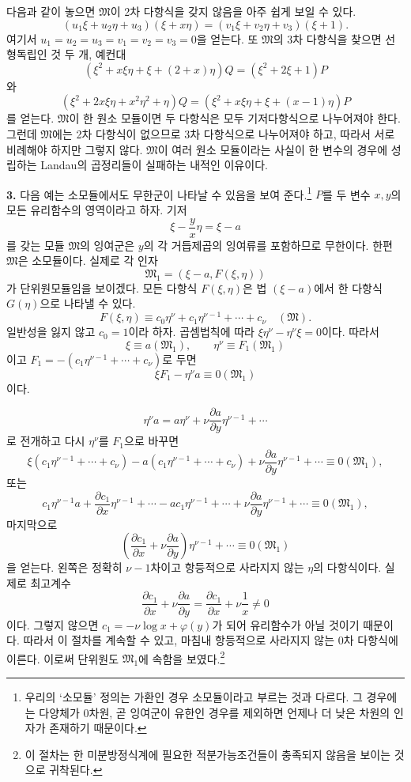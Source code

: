 다음과 같이 놓으면 \(\mathfrak M\)이 2차 다항식을 갖지 않음을 아주 쉽게 보일 수 있다.
\[
 (u_1\xi+u_2\eta+u_3)(\xi+x\eta)
 =(v_1\xi+v_2\eta+v_3)(\xi+1).
\]
여기서 \(u_1=u_2=u_3=v_1=v_2=v_3=0\)을 얻는다. 또 \(\mathfrak M\)의 3차 다항식을 찾으면 선형독립인 것 두 개, 예컨대
\[
 (\xi^2+x\xi\eta+\xi+(2+x)\eta)Q
 =(\xi^2+2\xi+1)P
\]
와
\[
 (\xi^2+2x\xi\eta+x^2\eta^2+\eta)Q
 =(\xi^2+x\xi\eta+\xi+(x-1)\eta)P
\]
를 얻는다. \(\mathfrak M\)이 한 원소 모듈이면 두 다항식은 모두 기저다항식으로 나누어져야 한다. 그런데 \(\mathfrak M\)에는 2차 다항식이 없으므로 3차 다항식으로 나누어져야 하고, 따라서 서로 비례해야 하지만 그렇지 않다. \(\mathfrak M\)이 여러 원소 모듈이라는 사실이 한 변수의 경우에 성립하는 Landau의 곱정리들이 실패하는 내적인 이유이다.

\textbf{3.} 다음 예는 소모듈에서도 무한군이 나타날 수 있음을 보여 준다.\footnote{우리의 ‘소모듈’ 정의는 가환인 경우 소모듈이라고 부르는 것과 다르다. 그 경우에는 다양체가 0차원, 곧 잉여군이 유한인 경우를 제외하면 언제나 더 낮은 차원의 인자가 존재하기 때문이다.} \(P\)를 두 변수 \(x,y\)의 모든 유리함수의 영역이라고 하자. 기저
\[
 \xi-\frac{y}{x}\eta=\xi-a
\]
를 갖는 모듈 \(\mathfrak M\)의 잉여군은 \(y\)의 각 거듭제곱의 잉여류를 포함하므로 무한이다. 한편 \(\mathfrak M\)은 소모듈이다. 실제로 각 인자
\[
 \mathfrak M_1=(\xi-a,F(\xi,\eta))
\]
가 단위원모듈임을 보이겠다. 모든 다항식 \(F(\xi,\eta)\)은 법 \((\xi-a)\)에서 한 다항식 \(G(\eta)\)으로 나타낼 수 있다.
\[
 F(\xi,\eta)\equiv
 c_0\eta^\nu+c_1\eta^{\nu-1}+\cdots+c_\nu
 \quad(\mathfrak M).
\]
일반성을 잃지 않고 \(c_0=1\)이라 하자. 곱셈법칙에 따라 \(\xi\eta^\nu-\eta^\nu\xi=0\)이다. 따라서
\[
 \xi\equiv a(\mathfrak M_1),\qquad
 \eta^\nu\equiv F_1(\mathfrak M_1)
\]
이고 \(F_1=-(c_1\eta^{\nu-1}+\cdots+c_\nu)\)로 두면
\[
 \xi F_1-\eta^\nu a\equiv0(\mathfrak M_1)
\]
이다.

\[
 \eta^\nu a
 =a\eta^\nu+\nu\frac{\partial a}{\partial y}\eta^{\nu-1}
 +\cdots
\]
로 전개하고 다시 \(\eta^\nu\)를 \(F_1\)으로 바꾸면
\[
 \xi(c_1\eta^{\nu-1}+\cdots+c_\nu)
 -a(c_1\eta^{\nu-1}+\cdots+c_\nu)
 +\nu\frac{\partial a}{\partial y}\eta^{\nu-1}
 +\cdots\equiv0(\mathfrak M_1),
\]
또는
\[
 c_1\eta^{\nu-1}a
 +\frac{\partial c_1}{\partial x}\eta^{\nu-1}+\cdots
 -ac_1\eta^{\nu-1}+\cdots
 +\nu\frac{\partial a}{\partial y}\eta^{\nu-1}+\cdots
 \equiv0(\mathfrak M_1),
\]
마지막으로
\[
 \left(\frac{\partial c_1}{\partial x}
 +\nu\frac{\partial a}{\partial y}\right)\eta^{\nu-1}
 +\cdots\equiv0(\mathfrak M_1)
\]
을 얻는다. 왼쪽은 정확히 \(\nu-1\)차이고 항등적으로 사라지지 않는 \(\eta\)의 다항식이다. 실제로 최고계수
\[
 \frac{\partial c_1}{\partial x}
 +\nu\frac{\partial a}{\partial y}
 =\frac{\partial c_1}{\partial x}+\nu\frac1x
 \ne0
\]
이다. 그렇지 않으면 \(c_1=-\nu\log x+\varphi(y)\)가 되어 유리함수가 아닐 것이기 때문이다. 따라서 이 절차를 계속할 수 있고, 마침내 항등적으로 사라지지 않는 0차 다항식에 이른다. 이로써 단위원도 \(\mathfrak M_1\)에 속함을 보였다.\footnote{이 절차는 한 미분방정식계에 필요한 적분가능조건들이 충족되지 않음을 보이는 것으로 귀착된다.}

